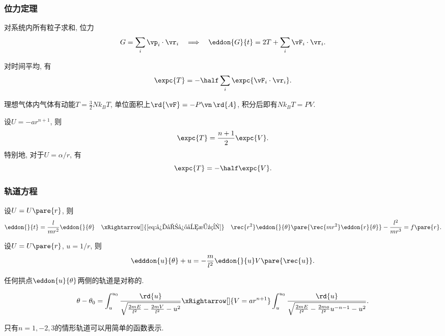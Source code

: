 \documentclass[../TheoreticalMechanics.tex]{subfiles}
\begin{document}
\subsubsection{位力定理} %
\label{ssub:位力定理}

\begin{lemma}[位力]
	对系统内所有粒子求和, 位力
	\[ G = \sum_i \vp_i\cdot\vr_i\quad \Longrightarrow \quad \eddon{G}{t} = 2T + \sum_i \vF_i\cdot\vr_i. \]
\end{lemma}
\begin{theorem}[位力定理]
	对时间平均, 有
	\[ \expc{T} = -\half\sum_i\expc{\vF_i\cdot\vr_i}. \]
\end{theorem}
\begin{ex}
	理想气体内气体有动能$T = \frac{3}{2}Nk_BT$, 单位面积上$\rd{\vF} = -P\vn\,\rd{A}$, 积分后即有$Nk_BT = PV$.
\end{ex}
\begin{finale}
	\begin{corollary}[幂势的位力定理]
        \label{coll:幂势的位力定理}
		设$U = -ar^{n+1}$, 则
		\[ \expc{T} = \frac{n+1}{2}\expc{V}. \]
		特别地, 对于$U = \alpha/r$, 有
		\[ \expc{T} = -\half\expc{V}. \]
	\end{corollary}
\end{finale}


\subsubsection{轨道方程} %
\label{ssub:轨道方程}

\begin{theorem}[径向的微分]
	设$U=U\pare{r}$, 则
	\[ \eddon{}{t} = \frac{l}{mr^2}\eddon{}{\theta}\quad\xRightarrow[]{\eqref{eq:径向微分方程}}\quad \rec{r^2}\eddon{}{\theta}\pare{\rec{mr^2}\eddon{r}{\theta}} - \frac{l^2}{mr^3} = f\pare{r}. \]
\end{theorem}
\begin{finale}
	\begin{corollary}[Binet方程]
		设$U=U\pare{r}$, $u=1/r$, 则
		\[ \edddon{u}{\theta} + u = -\frac{m}{l^2}\eddon{}{u}V\pare{\rec{u}}. \]
	\end{corollary}
\end{finale}
\begin{corollary}[轨道对称性]
	任何拱点$\eddon{u}{\theta}$两侧的轨道是对称的.
\end{corollary}
\begin{corollary}[轨道方程]\label{coll:轨道方程}\quad
	\[ \theta - \theta_0 = \int_{u}^{u_0} \frac{\rd{u}}{\sqrt{\frac{2mE}{l^2} - \frac{2mV}{l^2}-u^2}}\xRightarrow[]{V=ar^{n+1}}\int_{u}^{u_0} \frac{\rd{u}}{\sqrt{\frac{2mE}{l^2} - \frac{2ma}{l^2}u^{-n-1}-u^2}}. \]
\end{corollary}
\begin{remark}
	只有$n=1,-2,3$的情形轨道可以用简单的函数表示.
\end{remark}
\end{document}
